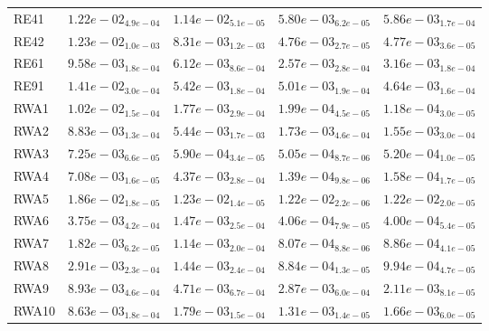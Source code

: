 \documentclass{article}
\begin{document}
\begin{table}
\begin{scriptsize}
\begin{tabular}{lllll}
RE41 & $  1.22e-02_{ 4.9e-04}$ & $  1.14e-02_{ 5.1e-05}$ & \cellcolor{gray95}$  5.80e-03_{ 6.2e-05}$ & \cellcolor{gray25}$  5.86e-03_{ 1.7e-04}$ \\
RE42 & $  1.23e-02_{ 1.0e-03}$ & $  8.31e-03_{ 1.2e-03}$ & \cellcolor{gray95}$  4.76e-03_{ 2.7e-05}$ & \cellcolor{gray25}$  4.77e-03_{ 3.6e-05}$ \\
RE61 & $  9.58e-03_{ 1.8e-04}$ & $  6.12e-03_{ 8.6e-04}$ & \cellcolor{gray95}$  2.57e-03_{ 2.8e-04}$ & \cellcolor{gray25}$  3.16e-03_{ 1.8e-04}$ \\
RE91 & $  1.41e-02_{ 3.0e-04}$ & $  5.42e-03_{ 1.8e-04}$ & \cellcolor{gray25}$  5.01e-03_{ 1.9e-04}$ & \cellcolor{gray95}$  4.64e-03_{ 1.6e-04}$ \\
RWA1 & $  1.02e-02_{ 1.5e-04}$ & $  1.77e-03_{ 2.9e-04}$ & \cellcolor{gray25}$  1.99e-04_{ 4.5e-05}$ & \cellcolor{gray95}$  1.18e-04_{ 3.0e-05}$ \\
RWA2 & $  8.83e-03_{ 1.3e-04}$ & $  5.44e-03_{ 1.7e-03}$ & \cellcolor{gray25}$  1.73e-03_{ 4.6e-04}$ & \cellcolor{gray95}$  1.55e-03_{ 3.0e-04}$ \\
RWA3 & $  7.25e-03_{ 6.6e-05}$ & $  5.90e-04_{ 3.4e-05}$ & \cellcolor{gray95}$  5.05e-04_{ 8.7e-06}$ & \cellcolor{gray25}$  5.20e-04_{ 1.0e-05}$ \\
RWA4 & $  7.08e-03_{ 1.6e-05}$ & $  4.37e-03_{ 2.8e-04}$ & \cellcolor{gray95}$  1.39e-04_{ 9.8e-06}$ & \cellcolor{gray25}$  1.58e-04_{ 1.7e-05}$ \\
RWA5 & $  1.86e-02_{ 1.8e-05}$ & $  1.23e-02_{ 1.4e-05}$ & \cellcolor{gray95}$  1.22e-02_{ 2.2e-06}$ & \cellcolor{gray25}$  1.22e-02_{ 2.0e-05}$ \\
RWA6 & $  3.75e-03_{ 4.2e-04}$ & $  1.47e-03_{ 2.5e-04}$ & \cellcolor{gray25}$  4.06e-04_{ 7.9e-05}$ & \cellcolor{gray95}$  4.00e-04_{ 5.4e-05}$ \\
RWA7 & $  1.82e-03_{ 6.2e-05}$ & $  1.14e-03_{ 2.0e-04}$ & \cellcolor{gray95}$  8.07e-04_{ 8.8e-06}$ & \cellcolor{gray25}$  8.86e-04_{ 4.1e-05}$ \\
RWA8 & $  2.91e-03_{ 2.3e-04}$ & $  1.44e-03_{ 2.4e-04}$ & \cellcolor{gray95}$  8.84e-04_{ 1.3e-05}$ & \cellcolor{gray25}$  9.94e-04_{ 4.7e-05}$ \\
RWA9 & $  8.93e-03_{ 4.6e-04}$ & $  4.71e-03_{ 6.7e-04}$ & \cellcolor{gray25}$  2.87e-03_{ 6.0e-04}$ & \cellcolor{gray95}$  2.11e-03_{ 8.1e-05}$ \\
RWA10 & $  8.63e-03_{ 1.8e-04}$ & $  1.79e-03_{ 1.5e-04}$ & \cellcolor{gray95}$  1.31e-03_{ 1.4e-05}$ & \cellcolor{gray25}$  1.66e-03_{ 6.0e-05}$ \\
\hline
\end{tabular}
\end{scriptsize}
\end{table}
\end{document}
